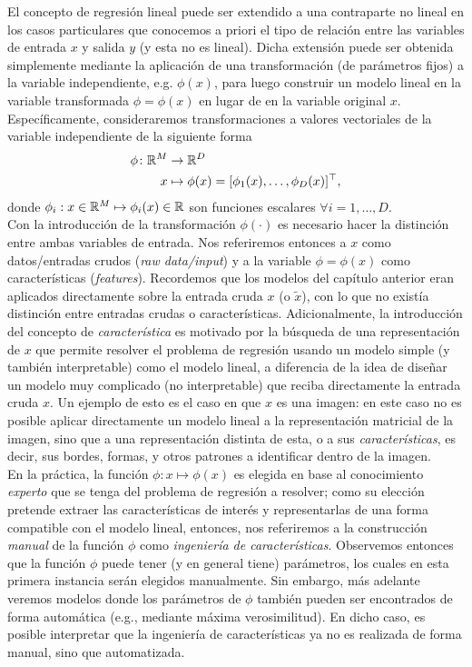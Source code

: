 El concepto de regresión lineal puede ser extendido a una contraparte no lineal en los casos particulares que conocemos a priori el tipo de relación entre las variables de entrada $x$ y salida $y$ (y esta  no es lineal). Dicha extensión puede ser obtenida simplemente mediante la aplicación de una transformación (de parámetros fijos) a la variable independiente, e.g. $\phi(x)$, para luego construir un modelo lineal en la variable transformada $\phi=\phi(x)$ en lugar de en la variable original $x$. \\

Específicamente, consideraremos transformaciones a valores vectoriales de la variable independiente de la siguiente forma
\begin{align}
  \phi \colon \mathbb{R}^M &\to \mathbb{R}^D \nonumber\\
  x &\mapsto \phi(x)=[\phi_1(x),\ldots,\phi_D(x)]^\top,
\end{align}
donde $\phi_i: x\in\mathbb{R}^M \mapsto \phi_i(x)\in\mathbb{R}$ son funciones escalares $\forall i=1,\ldots,D$.\\

Con la introducción de la transformación $\phi(\cdot)$ es necesario hacer la distinción entre ambas variables de entrada. Nos referiremos entonces a $x$ como datos/entradas crudos (\emph{raw data/input}) y a la variable  $\phi=\phi(x)$ como  características (\emph{features}). Recordemos que los modelos del capítulo anterior eran aplicados directamente sobre la entrada cruda $x$ (o $\tilde{x}$), con lo que no existía distinción entre entradas crudas o características. Adicionalmente, la introducción  del concepto de \emph{característica} es motivado por la búsqueda de una representación de $x$ que permite resolver el problema de regresión usando un modelo simple (y también interpretable) como el modelo lineal, a diferencia de la idea de diseñar un modelo muy complicado (no interpretable) que reciba directamente la entrada cruda $x$. Un ejemplo de esto es el caso en que $x$ es una imagen: en este caso no es posible aplicar directamente un modelo lineal a la representación matricial de la imagen, sino que a una representación distinta de esta, o a sus \emph{características}, es decir, sus bordes, formas, y otros patrones a identificar dentro de la imagen.\\

En la práctica, la función $\phi:x\mapsto\phi(x)$ es elegida en base  al conocimiento \emph{experto} que se tenga del problema de regresión a resolver;  como su elección pretende extraer las características de interés y representarlas  de una forma compatible con el modelo lineal, entonces, nos referiremos a la construcción \emph{manual} de la función $\phi$ como \emph{ingeniería de características}. Observemos entonces que la función $\phi$ puede tener (y en general tiene) parámetros, los cuales en esta primera instancia serán elegidos manualmente. Sin embargo, más adelante veremos modelos donde los parámetros de $\phi$ también pueden ser encontrados de forma automática (e.g., mediante máxima verosimilitud). En dicho caso, es posible interpretar que la ingeniería de características ya no es realizada de forma manual, sino que automatizada.  



